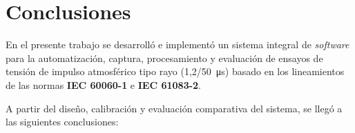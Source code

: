 \newpage
\chapter*{Conclusiones}
\label{ch:conclusiones}
\vspace{3\baselineskip}

En el presente trabajo se desarrolló e implementó un sistema integral de \emph{software} para la automatización, captura, procesamiento y evaluación de ensayos de tensión de impulso atmosférico tipo rayo (\qty[parse-numbers=false]{1,2/50}{\micro\second}) basado en los lineamientos de las normas \textbf{IEC 60060-1} e \textbf{IEC 61083-2}.

A partir del diseño, calibración y evaluación comparativa del sistema, se llegó a las siguientes conclusiones:

